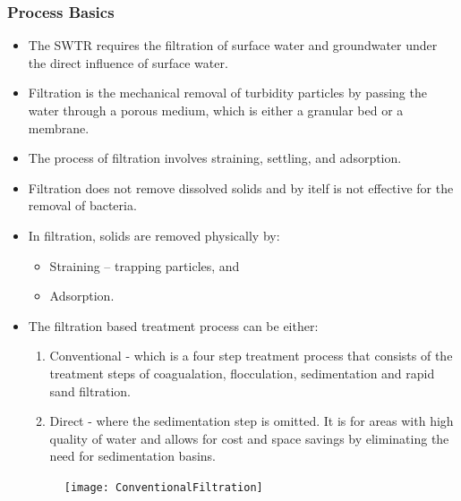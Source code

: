 \subsubsection{Process Basics}
\begin{itemize}
\item The SWTR requires the filtration of surface water and groundwater under the direct influence of surface water.
\item Filtration is the mechanical removal of turbidity particles by passing the water through a porous medium, which is either a granular bed or a membrane.
\item The process of filtration involves straining, settling, and adsorption.
\item Filtration does not remove dissolved solids and by itelf is not effective for the removal of bacteria.
\item In filtration, solids are removed physically by:
\begin{itemize}
\item Straining – trapping particles, and 
\item Adsorption.
\end{itemize}
\item The filtration based treatment process can be either:
\begin{enumerate}
\item Conventional - which is a four step treatment process that consists of the treatment steps of coagualation, flocculation, sedimentation and rapid sand filtration.  
\item Direct - where the sedimentation step is omitted. It is for areas with high quality of water and allows for cost and space savings by eliminating the need for sedimentation basins.  
\end{enumerate}
\begin{figure}[H]
\begin{center}
\texttt{[image: ConventionalFiltration]}\\
\label{Conventional filtration}
\end{center}
\end{figure}


\end{itemize}
